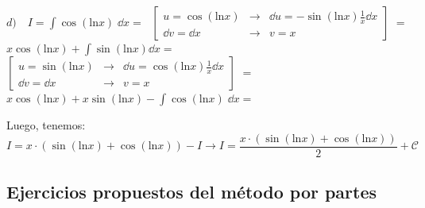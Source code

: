 \begin{proofw}
$d) \quad \displaystyle I= \int \cos(\mathrm{ln}x) \; \dd x =\; $ \small{$\left[ \begin{matrix} u=\cos(\mathrm{ln}x) & \to & \dd u = -\sin(\mathrm{ln}x) \frac 1 x \dd x \\ \dd v = \dd x & \to & v=x \end{matrix} \right]\;$} \normalsize{=} $x\cos(\mathrm{ln}x) + \int \sin(\mathrm{ln}x) \dd x=$ \small{$\left[ \begin{matrix} u=\sin(\mathrm{ln}x) & \to & \dd u = \cos(\mathrm{ln}x) \frac 1 x \dd x \\ \dd v = \dd x & \to & v=x  \end{matrix} \right]\;$} \normalsize{=}  $x\cos(\mathrm{ln}x) + x\sin(\mathrm{ln}x)- \int \cos(\mathrm{ln}x) \; \dd x =$

Luego, tenemos: $\displaystyle I= x \cdot  \left( \sin (\mathrm{ln} x) + \cos (\mathrm{ln} x) \right)-I \to I= \dfrac {x \cdot  \left( \sin (\mathrm{ln} x) + \cos (\mathrm{ln} x) \right)}{2}+\mathcal C$ 
	
\end{proofw}


\subsection{Ejercicios propuestos del método por partes}

